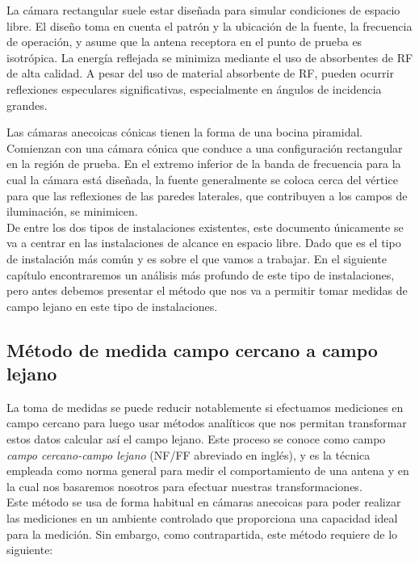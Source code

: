 La cámara rectangular suele estar diseñada para simular condiciones de espacio libre. El diseño toma en cuenta el patrón y la ubicación de la fuente, la frecuencia de operación, y asume que la antena receptora en el punto de prueba es isotrópica. La energía reflejada se minimiza mediante el uso de absorbentes de RF de alta calidad. A pesar del uso de material absorbente de RF, pueden ocurrir reflexiones especulares significativas, especialmente en ángulos de incidencia grandes.\\

\newpage

Las cámaras anecoicas cónicas tienen la forma de una bocina piramidal. Comienzan con una cámara cónica que conduce a una configuración rectangular en la región de prueba. En el extremo inferior de la banda de frecuencia para la cual la cámara está diseñada, la fuente generalmente se coloca cerca del vértice para que las reflexiones de las paredes laterales, que contribuyen a los campos de iluminación, se minimicen.\\


De entre los dos tipos de instalaciones existentes, este documento únicamente se va a centrar en las instalaciones de alcance en espacio libre. Dado que es el tipo de instalación más común y es sobre el que vamos a trabajar. En el siguiente capítulo encontraremos un análisis más profundo de este tipo de instalaciones, pero antes debemos presentar el método que nos va a permitir tomar medidas de campo lejano en este tipo de instalaciones.

\newpage

\subsection{Método de medida campo cercano a campo lejano}

La toma de medidas se puede reducir notablemente si efectuamos mediciones en campo cercano para luego usar métodos analíticos que nos permitan transformar estos datos calcular así el campo lejano. Este proceso se conoce como campo \textit{campo cercano-campo lejano} (NF/FF abreviado en inglés), y es la técnica empleada como norma general para medir el comportamiento de una antena y en la cual nos basaremos nosotros para efectuar nuestras transformaciones.\\

Este método se usa de forma habitual en cámaras anecoicas para poder realizar las mediciones en un ambiente controlado que proporciona una capacidad ideal para la medición. Sin embargo, como contrapartida, este método requiere de lo siguiente:

